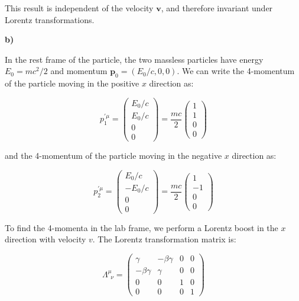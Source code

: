 \documentclass{article}
\begin{document}
This result is independent of the velocity $\mathbf{v}$, and therefore invariant under Lorentz transformations.

\textbf{b)}

In the rest frame of the particle, the two massless particles have energy $E_0 = mc^2/2$ and momentum $\mathbf{p}_0 = (E_0/c, 0, 0)$.  We can write the 4-momentum of the particle moving in the positive $x$ direction as:

\begin{equation*}
p_1^{\prime \mu} = \begin{pmatrix} E_0/c \\ E_0/c \\ 0 \\ 0 \end{pmatrix} = \frac{mc}{2} \begin{pmatrix} 1 \\ 1 \\ 0 \\ 0 \end{pmatrix}
\end{equation*}

and the 4-momentum of the particle moving in the negative $x$ direction as:

\begin{equation*}
p_2^{\prime \mu} = \begin{pmatrix} E_0/c \\ -E_0/c \\ 0 \\ 0 \end{pmatrix} = \frac{mc}{2} \begin{pmatrix} 1 \\ -1 \\ 0 \\ 0 \end{pmatrix}
\end{equation*}

To find the 4-momenta in the lab frame, we perform a Lorentz boost in the $x$ direction with velocity $v$. The Lorentz transformation matrix is:

\begin{equation*}
\Lambda^\mu_{\ \ \nu} = \begin{pmatrix} \gamma & -\beta \gamma & 0 & 0 \\ -\beta \gamma & \gamma & 0 & 0 \\ 0 & 0 & 1 & 0 \\ 0 & 0 & 0 & 1 \end{pmatrix}
\end{equation*}
\end{document}
